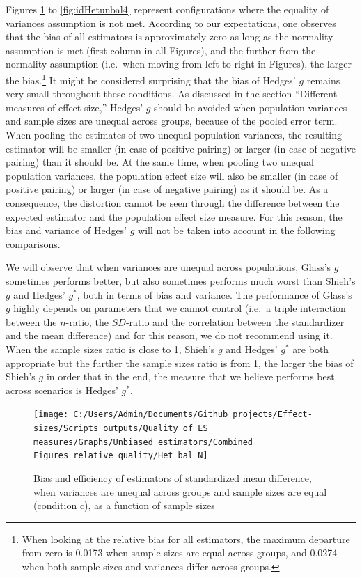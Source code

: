 \documentclass[
  english,
  man]{apa6}
\begin{document}
Figures \ref{fig:idHetbal1} to \ref{fig:idHetunbal4} represent configurations where the equality of variances assumption is not met. According to our expectations, one observes that the bias of all estimators is approximately zero as long as the normality assumption is met (first column in all Figures), and the further from the normality assumption (i.e.~when moving from left to right in Figures), the larger the bias.\footnote{When looking at the relative bias for all estimators, the maximum departure from zero is 0.0173 when sample sizes are equal across groups, and 0.0274 when both sample sizes and variances differ across groups.} It might be considered surprising that the bias of Hedges' \(g\) remains very small throughout these conditions. As discussed in the section ``Different measures of effect size,'' Hedges' \(g\) should be avoided when population variances and sample sizes are unequal across groups, because of the pooled error term. When pooling the estimates of two unequal population variances, the resulting estimator will be smaller (in case of positive pairing) or larger (in case of negative pairing) than it should be. At the same time, when pooling two unequal population variances, the population effect size will also be smaller (in case of positive pairing) or larger (in case of negative pairing) as it should be. As a consequence, the distortion cannot be seen through the difference between the expected estimator and the population effect size measure. For this reason, the bias and variance of Hedges' \(g\) will not be taken into account in the following comparisons.

We will observe that when variances are unequal across populations, Glass's \(g\) sometimes performs better, but also sometimes performs much worst than Shieh's \(g\) and Hedges' \(g^*\), both in terms of bias and variance. The performance of Glass's \(g\) highly depends on parameters that we cannot control (i.e.~a triple interaction between the \(n\)-ratio, the \(SD\)-ratio and the correlation between the standardizer and the mean difference) and for this reason, we do not recommend using it. When the sample sizes ratio is close to 1, Shieh's \(g\) and Hedges' \(g^*\) are both appropriate but the further the sample sizes ratio is from 1, the larger the bias of Shieh's \(g\) in order that in the end, the measure that we believe performs best across scenarios is Hedges' \(g^*\).

\begin{figure}

{\centering \texttt{[image: C:/Users/Admin/Documents/Github projects/Effect-sizes/Scripts outputs/Quality of ES measures/Graphs/Unbiased estimators/Combined Figures\_relative quality/Het\_bal\_N]} 

}

\caption{Bias and efficiency of estimators of standardized mean difference, when variances are unequal across groups and sample sizes are equal (condition c), as a function of sample sizes}\label{fig:idHetbal1}
\end{figure}
\end{document}

